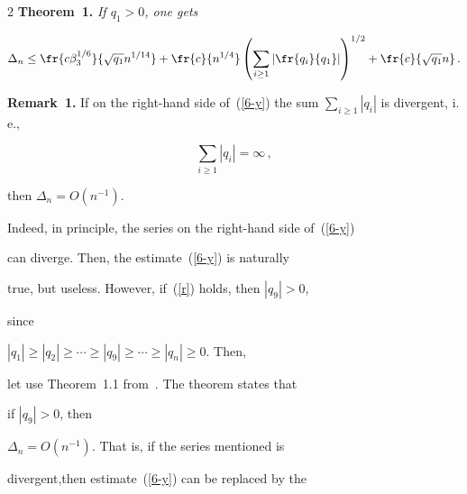 \begin{multicols}{2}
\textbf{Theorem~1.} \textit{If $q_1>0$, one gets}



\noindent

   \begin{equation}\label{6-y}

    \Delta_{n}\leq \fr{c\beta_3^{1/6}}{\sqrt{q_1}n^{1/14}}+\fr{c}{n^{1/4}}

    \left(\sum\limits_{i\geq 1}\left\vert\fr{q_i}{q_1}\right\vert\right)^{1/2}+

    \fr{c}{\sqrt{q_1}n}\,.

    \end{equation}



\smallskip





\noindent

\textbf{Remark~1.} If on the right-hand side of~(\ref{6-y}) the sum $\sum\limits_{i \geq

    1}|q_i|$ is divergent, i.\,e.,

    

    \noindent

    \begin{equation}

    \label{r}

    \sum\limits_{i\geq 1}|q_i|=\infty\,,  

    \end{equation}

    then $\Delta_{n}=O(n^{-1}).$



\smallskip



    Indeed, in principle, the series on the right-hand side of~(\ref{6-y}) 

    can diverge. Then, the estimate~(\ref{6-y}) is naturally

    true, but useless. However, if~(\ref{r}) holds, then $|q_9| >0$,

    since

    $|q_1| \geq |q_2| \geq\cdots\geq |q_9| \geq\cdots\geq |q_n| \geq0$. Then,

let use Theorem~1.1 from~\cite{1-y}. The theorem states that

    if $|q_9| >0$, then

     $\Delta_{n} =O(n^{-1})$. That is, if the series mentioned is

    divergent,then estimate~(\ref{6-y}) can be replaced by the


\end{multicols}
